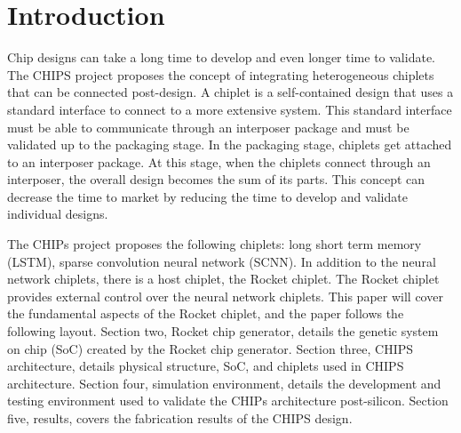 \documentclass[../main.tex]{subfiles}
\begin{document}
\section{Introduction}
Chip designs can take a long time to develop and even longer time to validate. The CHIPS project proposes the concept of integrating heterogeneous chiplets that can be connected post-design. A chiplet is a self-contained design that uses a standard interface to connect to a more extensive system. This standard interface must be able to communicate through an interposer package and must be validated up to the packaging stage. In the packaging stage, chiplets get attached to an interposer package. At this stage, when the chiplets connect through an interposer, the overall design becomes the sum of its parts.  This concept can decrease the time to market by reducing the time to develop and validate individual designs. 

The CHIPs project proposes the following chiplets:  long short term memory (LSTM), sparse convolution neural network (SCNN). In addition to the neural network chiplets, there is a host chiplet, the Rocket chiplet. The Rocket chiplet provides external control over the neural network chiplets. This paper will cover the fundamental aspects of the Rocket chiplet, and the paper follows the following layout. Section two, Rocket chip generator, details the genetic system on chip (SoC) created by the Rocket chip generator. Section three, CHIPS architecture, details physical structure, SoC, and chiplets used in CHIPS architecture. Section four, simulation environment, details the development and testing environment used to validate the CHIPs architecture post-silicon. Section five, results, covers the fabrication results of the CHIPS design.
\end{document}
